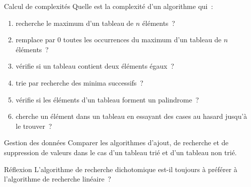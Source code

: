 			\begin{Exercice}{Calcul de complexités}
				Quelle est la complexité d’un algorithme qui~:		
				\begin{enumerate}[label=\alph*)]
				\item 
					recherche le maximum d’un tableau de $n$ éléments~?
				\item 
					remplace par 0 toutes les occurrences du maximum 
					d’un tableau de $n$ éléments~?
				\item 
					vérifie si un tableau contient deux éléments égaux~?
				\item 
					trie par recherche des minima successifs~?
				\item 
					vérifie si les éléments d’un tableau forment un palindrome~?
				\item
					cherche un élément dans un tableau 
					en essayant des cases au hasard jusqu’à le trouver~?
				\end{enumerate}
			\end{Exercice}

			\begin{Exercice}{Gestion des données}
				Comparer les algorithmes d’ajout, 
				de recherche et de suppression
				de valeurs dans le cas d’un tableau trié
				et d’un tableau non trié.
			\end{Exercice}
			
			\begin{Exercice}{Réflexion}
				L’algorithme de recherche dichotomique 
				est-il toujours à préférer à
				l’algorithme de recherche linéaire~?
			\end{Exercice}
	
